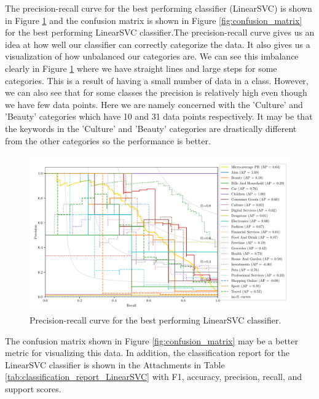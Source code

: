 The precision-recall curve for the best performing classifier (LinearSVC) is shown in Figure \ref{fig:pr_curve} and the confusion matrix is shown in Figure \ref{fig:confusion_matrix} for the best performing LinearSVC classifier.The precision-recall curve gives us an idea at how well our classifier can correctly categorize the data. It also gives us a visualization of how unbalanced our categories are. We can see this imbalance clearly in Figure \ref{fig:pr_curve} where we have straight lines and large steps for some categories. This is a result of having a small number of data in a class. However, we can also see that for some classes the precision is relatively high even though we have few data points. Here we are namely concerned with the 'Culture' and 'Beauty' categories which have 10 and 31 data points respectively. It may be that the keywords in the 'Culture' and 'Beauty' categories are drastically different from the other categories so the performance is better. 

\begin{figure}[ht]
  \centering
  \includegraphics[width=\scale\textwidth]{../img/plot_pr_curve.pdf}
  \caption{Precision-recall curve for the best performing LinearSVC classifier.}
  \label{fig:pr_curve}
\end{figure}

The confusion matrix shown in Figure \ref{fig:confusion_matrix} may be a better metric for visualizing this data. In addition, the classification report for the LinearSVC classifier is shown in the Attachments in Table \ref{tab:classification_report_LinearSVC} with F1, accuracy, precision, recall, and support scores.

